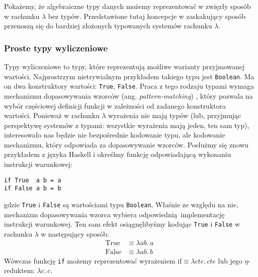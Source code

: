 Pokażemy, że algebraiczne typy danych możemy reprezentować w zwięzły sposób w rachunku \(\lambda\) bez typów. Przedstawione tutaj koncepcje w zaskakujący sposób przenoszą się do bardziej złożonych typowanych systemów rachunku \(\lambda\).

\subsubsection{Proste typy wyliczeniowe}\label{ref:untyped_simple_enumeration}
Typy wyliczeniowe to typy, które reprezentują możliwe warianty przyjmowanej wartości. Najprostrzym nietrywialnym przykładem takiego typu jest \texttt{Boolean}. Ma on dwa konstruktory wartości: \texttt{True}, \texttt{False}. Praca z tego rodzaju typami wymaga mechanizmu dopasowywania wzorców (ang. \emph{pattern-matching}) \cite[Rozdział IV]{PeytonJones:1992:IFL:129390}, który pozwala na wybór częściowej definicji funkcji w zależności od zadanego konstruktora wartości. Ponieważ w rachunku \(\lambda\) wyrażenia nie mają typów (lub, przyjmując perspektywę systemów z typami: wszystkie wyrażenia mają jeden, ten sam typ), interesowało nas będzie nie bezpośrednie kodowanie typu, ale kodowanie mechanizmu, który odpowiada za dopasowywanie wzorców. Posłużmy się znowu przykładem z języka Haskell i określmy funkcję odpowiadającą wykonaniu instrukcji warunkowej:
\begin{verbatim}
if True  a b = a
if False a b = b
\end{verbatim}
gdzie \texttt{True} i \texttt{False} są wartościami typu \texttt{Boolean}. Właśnie ze względu na nie, mechanizm dopasowywania wzorca wybiera odpowiednią implementację instrukcji warunkowej. Ten sam efekt osiągnęlibyśmy kodując \texttt{True} i \texttt{False} w rachunku \(\lambda\) w następujący sposób:
\begin{align*}
  \mathrm{True} &\equiv \lambda a b.\,a\\
  \mathrm{False} &\equiv \lambda a b.\,b
\end{align*}
Wówczas funkcję \texttt{if} możemy reprezentować wyrażeniem \(\mathrm{if}\equiv\lambda c t e.\, cte\) lub jego \(\eta\)-reduktem: \(\lambda c.\,c\).

